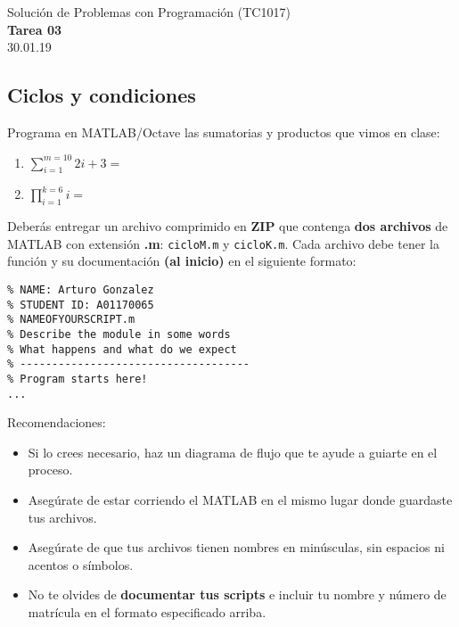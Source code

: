 \documentclass[]{book}
\theoremstyle{definition}
\newcommand{\textdf}[1]{\textbf{\textsf{#1}}\index{#1}}
\begin{document}
\begin{center}
{\huge Solución de Problemas con Programación (TC1017)}\\[1.5ex]
{\large \textbf{Tarea 03}\\[1.5ex] %
30.01.19} %
\end{center}

\vspace{0.2 cm}

\subsection*{Ciclos y condiciones}

Programa en MATLAB/Octave las sumatorias y productos que vimos en clase:

\begin{enumerate}[label=\alph*)]
    \itemsep2.5ex
    \item {\Large $\sum \limits_{i=1}^{m=10} 2i + 3 =$}
    \item {\Large $\prod \limits_{i=1}^{k=6} i =$}
\end{enumerate}

\bigskip

Deberás entregar un archivo comprimido en \textbf{ZIP} que contenga \textbf{dos archivos} de MATLAB con extensión \textbf{.m}:
\texttt{cicloM.m} y \texttt{cicloK.m}.
Cada archivo debe tener la función y su documentación \textdf{(al inicio)} en el siguiente formato:

\bigskip

\begin{lstlisting}[style=Matlab-editor]
% ------------------------------------
% NAME: Arturo Gonzalez
% STUDENT ID: A01170065
% NAMEOFYOURSCRIPT.m
% Describe the module in some words
% What happens and what do we expect
% ------------------------------------
% Program starts here!
...
\end{lstlisting}

\bigskip

{\Large Recomendaciones:}
\begin{itemize}
    \item Si lo crees necesario, haz un diagrama de flujo que te ayude a guiarte en el proceso.
    \item Asegúrate de estar corriendo el MATLAB en el mismo lugar donde guardaste tus archivos.
    \item Asegúrate de que tus archivos tienen nombres en minúsculas, sin espacios ni acentos o símbolos. 
    \item No te olvides de \textbf{documentar tus scripts} e incluir tu nombre y número de matrícula en el formato especificado arriba.
\end{itemize}
\end{document}

